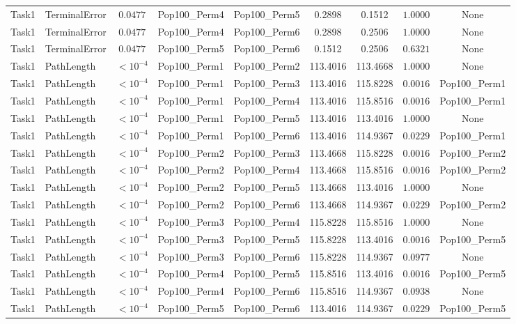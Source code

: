 \documentclass[8pt]{article}
\begin{document}
\begin{longtable}{llccccccc}
Task1 & TerminalError & $0.0477$ & Pop100\_Perm4 & Pop100\_Perm5 & 0.2898 & 0.1512 & $1.0000$ & None \\
Task1 & TerminalError & $0.0477$ & Pop100\_Perm4 & Pop100\_Perm6 & 0.2898 & 0.2506 & $1.0000$ & None \\
Task1 & TerminalError & $0.0477$ & Pop100\_Perm5 & Pop100\_Perm6 & 0.1512 & 0.2506 & $0.6321$ & None \\
Task1 & PathLength & $< 10^{-4}$ & Pop100\_Perm1 & Pop100\_Perm2 & 113.4016 & 113.4668 & $1.0000$ & None \\
Task1 & PathLength & $< 10^{-4}$ & Pop100\_Perm1 & Pop100\_Perm3 & 113.4016 & 115.8228 & $0.0016$ & Pop100\_Perm1 \\
Task1 & PathLength & $< 10^{-4}$ & Pop100\_Perm1 & Pop100\_Perm4 & 113.4016 & 115.8516 & $0.0016$ & Pop100\_Perm1 \\
Task1 & PathLength & $< 10^{-4}$ & Pop100\_Perm1 & Pop100\_Perm5 & 113.4016 & 113.4016 & $1.0000$ & None \\
Task1 & PathLength & $< 10^{-4}$ & Pop100\_Perm1 & Pop100\_Perm6 & 113.4016 & 114.9367 & $0.0229$ & Pop100\_Perm1 \\
Task1 & PathLength & $< 10^{-4}$ & Pop100\_Perm2 & Pop100\_Perm3 & 113.4668 & 115.8228 & $0.0016$ & Pop100\_Perm2 \\
Task1 & PathLength & $< 10^{-4}$ & Pop100\_Perm2 & Pop100\_Perm4 & 113.4668 & 115.8516 & $0.0016$ & Pop100\_Perm2 \\
Task1 & PathLength & $< 10^{-4}$ & Pop100\_Perm2 & Pop100\_Perm5 & 113.4668 & 113.4016 & $1.0000$ & None \\
Task1 & PathLength & $< 10^{-4}$ & Pop100\_Perm2 & Pop100\_Perm6 & 113.4668 & 114.9367 & $0.0229$ & Pop100\_Perm2 \\
Task1 & PathLength & $< 10^{-4}$ & Pop100\_Perm3 & Pop100\_Perm4 & 115.8228 & 115.8516 & $1.0000$ & None \\
Task1 & PathLength & $< 10^{-4}$ & Pop100\_Perm3 & Pop100\_Perm5 & 115.8228 & 113.4016 & $0.0016$ & Pop100\_Perm5 \\
Task1 & PathLength & $< 10^{-4}$ & Pop100\_Perm3 & Pop100\_Perm6 & 115.8228 & 114.9367 & $0.0977$ & None \\
Task1 & PathLength & $< 10^{-4}$ & Pop100\_Perm4 & Pop100\_Perm5 & 115.8516 & 113.4016 & $0.0016$ & Pop100\_Perm5 \\
Task1 & PathLength & $< 10^{-4}$ & Pop100\_Perm4 & Pop100\_Perm6 & 115.8516 & 114.9367 & $0.0938$ & None \\
Task1 & PathLength & $< 10^{-4}$ & Pop100\_Perm5 & Pop100\_Perm6 & 113.4016 & 114.9367 & $0.0229$ & Pop100\_Perm5 \\

\end{longtable}
\end{document}
